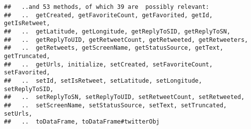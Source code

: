 \documentclass[]{article}
\newenvironment{Shaded}{\begin{snugshade}}{\end{snugshade}}
\newcommand{\KeywordTok}[1]{\textcolor[rgb]{0.13,0.29,0.53}{\textbf{#1}}}
\newcommand{\StringTok}[1]{\textcolor[rgb]{0.31,0.60,0.02}{#1}}
\newcommand{\CommentTok}[1]{\textcolor[rgb]{0.56,0.35,0.01}{\textit{#1}}}
\newcommand{\OperatorTok}[1]{\textcolor[rgb]{0.81,0.36,0.00}{\textbf{#1}}}
\newcommand{\NormalTok}[1]{#1}
\begin{document}
\begin{verbatim}
##   ..and 53 methods, of which 39 are  possibly relevant:
##   ..  getCreated, getFavoriteCount, getFavorited, getId, getIsRetweet,
##   ..  getLatitude, getLongitude, getReplyToSID, getReplyToSN,
##   ..  getReplyToUID, getRetweetCount, getRetweeted, getRetweeters,
##   ..  getRetweets, getScreenName, getStatusSource, getText, getTruncated,
##   ..  getUrls, initialize, setCreated, setFavoriteCount, setFavorited,
##   ..  setId, setIsRetweet, setLatitude, setLongitude, setReplyToSID,
##   ..  setReplyToSN, setReplyToUID, setRetweetCount, setRetweeted,
##   ..  setScreenName, setStatusSource, setText, setTruncated, setUrls,
##   ..  toDataFrame, toDataFrame#twitterObj
\end{verbatim}

\begin{Shaded}
\end{Shaded}
\end{document}
